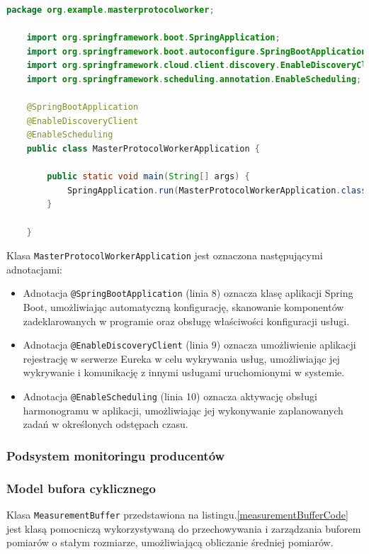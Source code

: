 \begin{lstlisting}[language=Java, caption=Główna klasa węzła protokołu, label=protocolWorkerMainClass]
    package org.example.masterprotocolworker;

    import org.springframework.boot.SpringApplication;
    import org.springframework.boot.autoconfigure.SpringBootApplication;
    import org.springframework.cloud.client.discovery.EnableDiscoveryClient;
    import org.springframework.scheduling.annotation.EnableScheduling;
    
    @SpringBootApplication
    @EnableDiscoveryClient
    @EnableScheduling
    public class MasterProtocolWorkerApplication {
    
        public static void main(String[] args) {
            SpringApplication.run(MasterProtocolWorkerApplication.class, args);
        }
    
    }
\end{lstlisting}

Klasa \verb|MasterProtocolWorkerApplication| jest oznaczona następującymi adnotacjami:
\begin{itemize}
    \item Adnotacja \verb|@SpringBootApplication| (linia 8) oznacza klasę aplikacji Spring Boot, umożliwiając automatyczną konfigurację, skanowanie komponentów zadeklarowanych w programie oraz obsługę właściwości konfiguracji usługi.
    \item Adnotacja \verb|@EnableDiscoveryClient| (linia 9) oznacza umożliwienie aplikacji rejestrację w serwerze Eureka w celu wykrywania usług, umożliwiając jej wykrywanie i komunikację z innymi usługami uruchomionymi w systemie.
    \item Adnotacja \verb|@EnableScheduling| (linia 10) oznacza aktywację obsługi harmonogramu w aplikacji, umożliwiając jej wykonywanie zaplanowanych zadań w określonych odstępach czasu.
\end{itemize}

\subsubsection{Podsystem monitoringu producentów}

\subsubsection{Model bufora cyklicznego}

Klasa \verb|MeasurementBuffer| przedstawiona na listingu.\ref{measurementBufferCode} jest klasą pomocniczą wykorzystywaną do przechowywania i zarządzania buforem pomiarów o stałym rozmiarze, umożliwiającą obliczanie średniej pomiarów.

